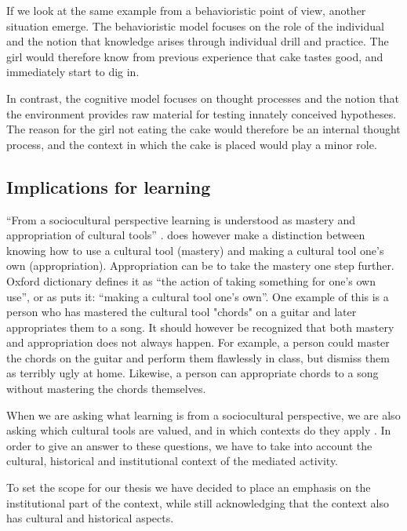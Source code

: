 If we look at the same example from a behavioristic point of view, another situation emerge. The behavioristic model focuses on the role of the individual and the notion that knowledge arises through individual drill and practice. The girl would therefore know from previous experience that cake tastes good, and immediately start to dig in. 

In contrast, the cognitive model focuses on thought processes and the notion that the environment provides raw material for testing innately conceived hypotheses. The reason for the girl not eating the cake would therefore be an internal thought process, and the context in which the cake is placed would play a minor role. 

\subsection{Implications for learning}
“From a sociocultural perspective learning is understood as mastery and appropriation of cultural tools” \citetext{Wertsch, 1998, Säljö, 1999, 2001, cited in \citealp{mifsud2010reconsidering}, p. 152}. \citet{wertsch1998mind} does however make a distinction between knowing how to use a cultural tool (mastery) and making a cultural tool one’s own (appropriation). Appropriation can be to take the mastery one step further. Oxford dictionary defines it as “the action of taking something for one’s own use”, or as \citet[p. 145]{wertsch1998mind} puts it: “making a cultural tool one’s own”. One example of this is a person who has mastered the cultural tool "chords" on a guitar and later appropriates them to a song. It should however be recognized that both mastery and appropriation does not always happen. For example, a person could master the chords on the guitar and perform them flawlessly in class, but dismiss them as terribly ugly at home. Likewise, a person can appropriate chords to a song without mastering the chords themselves.

When we are asking what learning is from a sociocultural perspective, we are also asking which cultural tools are valued, and in which contexts do they apply \citep{mifsud2010reconsidering}. In order to give an answer to these questions, we have to take into account the cultural, historical and institutional context of the mediated activity. 

To set the scope for our thesis we have decided to place an emphasis on the institutional part of the context, while still acknowledging that the context also has cultural and historical aspects.  

